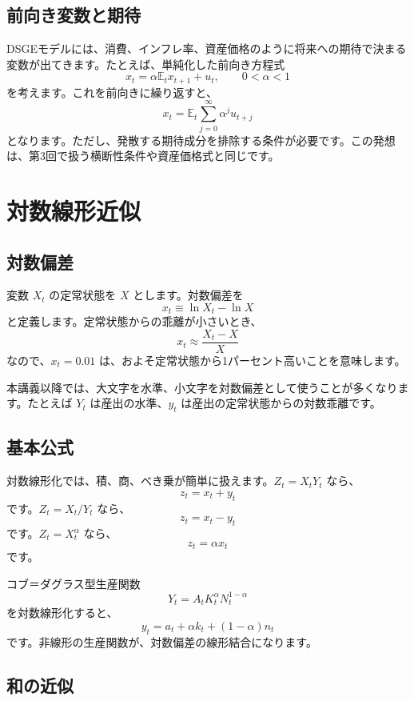 \documentclass[
  japanese,
  lualatex,
  ja=standard,
  12pt,
  a4paper]{ltjsarticle}
\begin{document}
\subsection{前向き変数と期待}\label{ux524dux5411ux304dux5909ux6570ux3068ux671fux5f85}

DSGEモデルには、消費、インフレ率、資産価格のように将来への期待で決まる変数が出てきます。たとえば、単純化した前向き方程式
\[
x_t=\alpha\mathbb{E}_t x_{t+1}+u_t,
\qquad 0<\alpha<1
\] を考えます。これを前向きに繰り返すと、 \[
x_t
=
\mathbb{E}_t
\sum_{j=0}^{\infty}\alpha^j u_{t+j}
\]
となります。ただし、発散する期待成分を排除する条件が必要です。この発想は、第3回で扱う横断性条件や資産価格式と同じです。

\section{対数線形近似}\label{ux5bfeux6570ux7ddaux5f62ux8fd1ux4f3c}

\subsection{対数偏差}\label{ux5bfeux6570ux504fux5dee}

変数 \(X_t\) の定常状態を \(X\) とします。対数偏差を \[
x_t
\equiv
\ln X_t-\ln X
\] と定義します。定常状態からの乖離が小さいとき、 \[
x_t
\approx
\frac{X_t-X}{X}
\] なので、\(x_t=0.01\)
は、およそ定常状態から1パーセント高いことを意味します。

本講義以降では、大文字を水準、小文字を対数偏差として使うことが多くなります。たとえば
\(Y_t\) は産出の水準、\(y_t\) は産出の定常状態からの対数乖離です。

\subsection{基本公式}\label{ux57faux672cux516cux5f0f}

対数線形化では、積、商、べき乗が簡単に扱えます。\(Z_t=X_tY_t\) なら、 \[
z_t=x_t+y_t
\] です。\(Z_t=X_t/Y_t\) なら、 \[
z_t=x_t-y_t
\] です。\(Z_t=X_t^\alpha\) なら、 \[
z_t=\alpha x_t
\] です。

コブ＝ダグラス型生産関数 \[
Y_t=A_tK_t^\alpha N_t^{1-\alpha}
\] を対数線形化すると、 \[
y_t=a_t+\alpha k_t+(1-\alpha)n_t
\] です。非線形の生産関数が、対数偏差の線形結合になります。

\subsection{和の近似}\label{ux548cux306eux8fd1ux4f3c}
\end{document}
